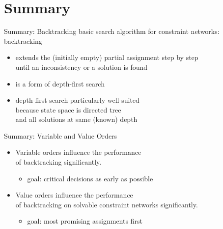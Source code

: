 \section{Summary}

\begin{frame}{Summary: Backtracking}
  basic search algorithm for constraint networks:
  \alert{backtracking}
  \begin{itemize}
    \item extends the (initially empty) partial assignment step by
    step \\ until an \alert{inconsistency} or a \alert{solution} is
    found
    \item is a form of \alert{depth-first search}
    \item depth-first search particularly well-suited \\ because
    state space is directed tree \\ and all solutions at same (known)
    depth
  \end{itemize}
\end{frame}

\begin{frame}{Summary: Variable and Value Orders}
  \begin{itemize}
    \item \alert{Variable orders} influence the performance\\ of
    backtracking significantly.
    \begin{itemize}
      \item goal: \alert{critical} decisions as early as possible
    \end{itemize}
    \item \alert{Value orders} influence the performance  \\ of
    backtracking on \alert{solvable} constraint networks significantly.
    \begin{itemize}
      \item goal: \alert{most promising} assignments first
    \end{itemize}
  \end{itemize}
\end{frame}


